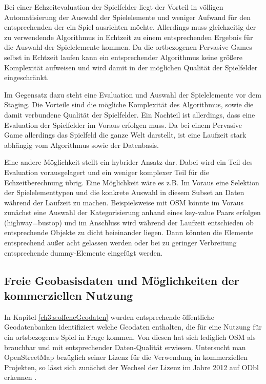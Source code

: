 Bei einer Echzeitevaluation der Spielfelder liegt der Vorteil in völligen Automatisierung der Auswahl der Spielelemente und weniger Aufwand für den entsprechenden der ein Spiel ausrichten möchte. Allerdings muss gleichzeitig der zu verwendende Algorithmus in Echtzeit zu einem entsprechenden Ergebnis für die Auswahl der Spielelemente kommen. Da die ortbezogenen Pervasive Games selbst in Echtzeit laufen kann ein entsprechender Algorithmus keine größere Komplexität aufweisen und wird damit in der möglichen Qualität der Spielfelder eingeschränkt.

Im Gegensatz dazu steht eine Evaluation und Auswahl der Spielelemente vor dem Staging. Die Vorteile sind die mögliche Komplexität des Algorithmus, sowie die damit verbundene Qualität der Spielfelder. Ein Nachteil ist allerdings, dass eine Evaluation der Spielfelder im Voraus erfolgen muss. Da bei einem Pervasive Game allerdings das Spielfeld die ganze Welt darstellt, ist eine Laufzeit stark abhängig vom Algorithmus sowie der Datenbasis.

Eine andere Möglichkeit stellt ein hybrider Ansatz dar. Dabei wird ein Teil des Evaluation vorausgelagert und ein weniger komplexer Teil für die Echzeitberechnung übrig. Eine Möglichkeit wäre es z.B. Im Voraus eine Selektion der Spielelementtypen und die konkrete Auswahl in diesem Subset an Daten während der Laufzeit zu machen. Beispielsweise mit OSM könnte im Voraus zunächst eine Auswahl der Kategorisierung anhand eines key-value Paars erfolgen (highway=bustop) und im Anschluss wird während der Laufzeit entschieden ob entsprechende Objekte zu dicht beieinander liegen. Dann könnten die Elemente entsprechend außer acht gelassen werden oder bei zu geringer Verbreitung entsprechende dummy-Elemente eingefügt werden.

\subsection*{Freie Geobasisdaten und Möglichkeiten der kommerziellen Nutzung}

In Kapitel \ref{ch3:s:offeneGeodaten} wurden entsprechende öffentliche Geodatenbanken identifiziert welche Geodaten enthalten, die für eine Nutzung für ein ortsbezogenes Spiel in Frage kommen. Von diesen hat sich lediglich OSM als brauchbar und mit entsprechender Daten-Qualität erwiesen. Untersucht man OpenStreetMap bezüglich seiner Lizenz für die Verwendung in kommerziellen Projekten, so lässt sich zunächst der Wechsel der Lizenz im Jahre 2012 auf ODbl erkennen \cite{Ramthun.2012}.

